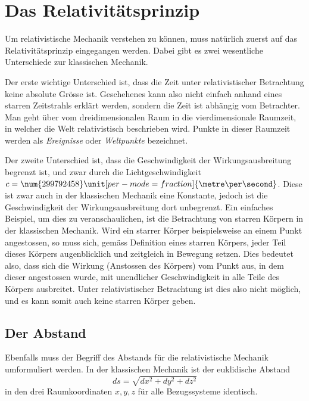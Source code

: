
\section{Das Relativitätsprinzip 
\label{relativ:section:relativistik}}

Um relativistische Mechanik verstehen zu können,
muss natürlich zuerst auf das Relativitätsprinzip eingegangen werden.
Dabei gibt es zwei wesentliche Unterschiede zur klassischen Mechanik.

Der erste wichtige Unterschied ist, dass die Zeit unter relativistischer Betrachtung keine absolute Grösse ist.
Geschehenes kann also nicht einfach anhand eines starren Zeitstrahls erklärt werden, sondern die Zeit ist abhängig vom Betrachter.
Man geht über vom dreidimensionalen Raum in die vierdimensionale Raumzeit, in welcher die Welt relativistisch beschrieben wird.
Punkte in dieser Raumzeit werden als \emph{Ereignisse} oder \emph{Weltpunkte} bezeichnet.

Der zweite Unterschied ist,
dass die Geschwindigkeit der Wirkungsausbreitung begrenzt ist,
und zwar durch die Lichtgeschwindigkeit
\(c=\num{299792458}\unit[per-mode = fraction]{\metre\per\second}\).
Diese ist zwar auch in der klassischen Mechanik eine Konstante,
jedoch ist die Geschwindigkeit der Wirkungsausbreitung dort unbegrenzt.
Ein einfaches Beispiel, um dies zu veranschaulichen,
ist die Betrachtung von starren Körpern in der klassischen Mechanik.
Wird ein starrer Körper beispielsweise an einem Punkt angestossen,
so muss sich, gemäss Definition eines starren Körpers,
jeder Teil dieses Körpers augenblicklich und zeitgleich in Bewegung setzen.
Dies bedeutet also, dass sich die Wirkung (Anstossen des Körpers)
vom Punkt aus, in dem dieser angestossen wurde,
mit unendlicher Geschwindigkeit in alle Teile des Körpers ausbreitet.
Unter relativistischer Betrachtung ist dies also nicht möglich,
und es kann somit auch keine starren Körper geben.


\subsection{Der Abstand 
\label{relativ:section:abstand}}

Ebenfalls muss der Begriff des Abstands für die relativistische Mechanik umformuliert werden.
In der klassischen Mechanik ist der euklidische Abstand
\begin{equation}
    ds=\sqrt{dx^2 + dy^2 + dz^2}
    \label{relativ:eqn:abstand-klass}
\end{equation}
in den drei Raumkoordinaten \(x, y, z\)
für alle Bezugssysteme identisch.

